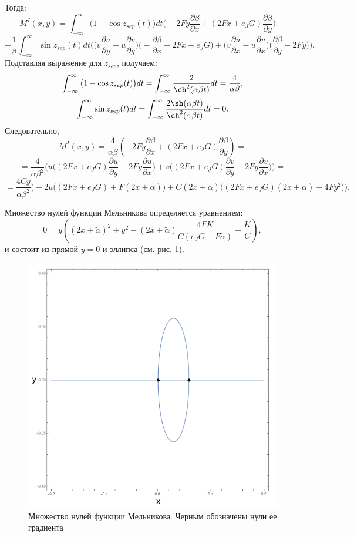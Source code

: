 Тогда:
$$M^I(x,y) = \int_{-\infty}^{\infty}\big(1-\cos z_{sep}(t)\big)dt \bigg( -2Fy \frac{\partial \beta}{\partial x} + (2Fx+e_J G) \frac{\partial \beta}{\partial y} \bigg) + $$
$$+ \frac{1}{\beta} \int_{-\infty}^{\infty} \sin z_{sep}(t)dt \Bigg( 
\bigg(v \frac{\partial u}{\partial y}-u \frac{\partial v}{\partial y}\bigg) \Big(-\frac{\partial \beta}{\partial x} + 2Fx+e_JG \Big)+\bigg(v \frac{\partial u}{\partial x}-u \frac{\partial v}{\partial x}\bigg) \Big(\frac{\partial \beta}{\partial y} - 2Fy \Big)
\Bigg).$$
Подставляя выражение для $z_{sep}$, получаем:
$$\int_{-\infty}^{\infty} \big(1-\cos z_{sep}(t) \big)dt = \int_{-\infty}^{\infty}\frac{2}{\ch^{2}(\alpha\beta t)}dt = \frac{4}{\alpha \beta},$$
$$\int_{-\infty}^{\infty} \sin z_{sep}(t)dt = \int_{-\infty}^{\infty}\frac{2\sh(\alpha\beta t)}{\ch^{2}(\alpha\beta t)}dt = 0.$$
Следовательно,
$$M^I(x,y)= \frac{4}{\alpha \beta} \left( 
    -2Fy \frac{\partial \beta}{\partial x} + (2Fx+e_J G) \frac{\partial \beta}{\partial y}
\right) = $$
$$ = \frac{4}{\alpha \beta^2} \Bigg( 
    u \bigg( (2Fx+e_J G)\frac{\partial u}{\partial y} - 2Fy \frac{\partial u}{\partial x} \bigg) + 
    v \bigg((2Fx+e_J G)\frac{\partial v}{\partial y} - 2Fy \frac{\partial v}{\partial x} \bigg)
\Bigg) = $$
$$ = \frac{4 Cy}{\alpha \beta^2} \Big( 
    -2u \big( (2Fx+e_J G)+F(2x+\tilde \alpha) \big)+C(2x+\tilde \alpha) \big( (2Fx+e_JG)(2x+\tilde \alpha)-4Fy^2 \big)
\Big).$$

Множество нулей функции Мельникова определяется уравнением:
$$ 0 = y \left( 
    (2x+\tilde \alpha)^2+y^2-(2x+\tilde \alpha)\frac{4FK}{C(e_JG-F \tilde \alpha)} - \frac KC
\right),$$
и состоит из прямой $y=0$ и эллипса (см. рис. \ref{zeroes}).

\begin{figure}[H]
\centering
\includegraphics[scale=0.45]{../img/zeros.png}
\caption{Множество нулей функции Мельникова. Черным обозначены нули ее градиента}
\label{zeroes}
\end{figure}

